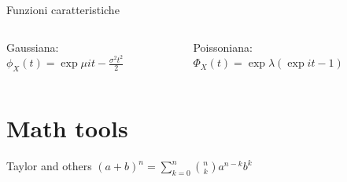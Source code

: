 \documentclass[asd-beamer.tex]{subfiles}
\begin{document}

\begin{wordonframe}{Funzioni caratteristiche}
\begin{columns}[T]
	\begin{column}{0.5\textwidth}
Gaussiana: $\phi_X(t)=\exp{\mu it-\frac{\sigma^2t^2}{2}}$
	\end{column}
	\begin{column}{0.5\textwidth}
Poissoniana: $\Phi_X(t)=\exp{\lambda(\exp{it}-1)}$
	\end{column}
\end{columns}
\end{wordonframe}

\section{Math tools}

\begin{wordonframe}{Taylor and others}
$(a+b)^n=\sum_{k=0}^n\binom{n}{k}a^{n-k}b^k$
\end{wordonframe}
\end{document}
